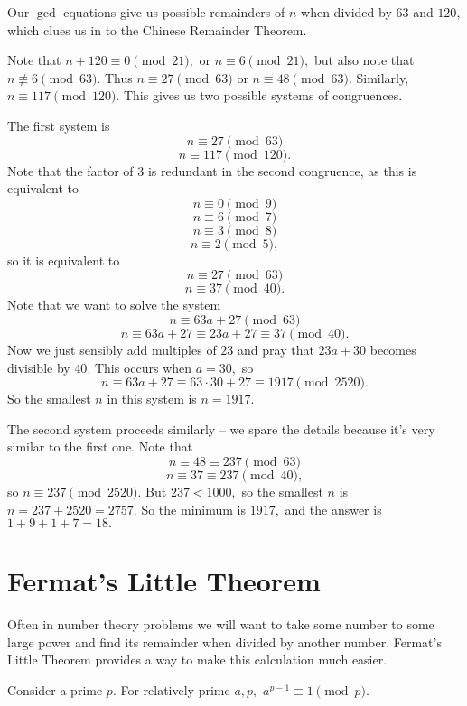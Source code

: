 \documentclass{article}
\begin{document}
\begin{sol}
Our $\gcd$ equations give us possible remainders of $n$ when divided by $63$ and $120,$ which clues us in to the Chinese Remainder Theorem.

Note that $n+120\equiv 0\pmod{21},$ or $n\equiv 6\pmod{21},$ but also note that $n\not\equiv 6\pmod{63}.$ Thus $n\equiv 27\pmod{63}$ or $n\equiv 48\pmod{63}.$ Similarly, $n\equiv 117\pmod{120}.$ This gives us two possible systems of congruences.

The first system is
\[n\equiv 27\pmod{63}\]
\[n\equiv 117\pmod{120}.\]
Note that the factor of $3$ is redundant in the second congruence, as this is equivalent to
\[n\equiv 0\pmod{9}\]
\[n\equiv 6\pmod{7}\]
\[n\equiv 3\pmod{8}\]
\[n\equiv 2\pmod{5},\]
so it is equivalent to
\[n\equiv 27\pmod{63}\]
\[n\equiv 37\pmod{40}.\]
Note that we want to solve the system
\[n\equiv 63a+27\pmod{63}\]
\[n\equiv 63a+27\equiv 23a+27\equiv 37\pmod{40}.\]
Now we just sensibly add multiples of $23$ and pray that $23a+30$ becomes divisible by $40.$ This occurs when $a=30,$ so
\[n\equiv 63a+27\equiv 63\cdot 30+27\equiv 1917\pmod{2520}.\]
So the smallest $n$ in this system is $n=1917.$

The second system proceeds similarly -- we spare the details because it's very similar to the first one. Note that
\[n\equiv 48\equiv 237\pmod{63}\]
\[n\equiv 37\equiv 237\pmod{40},\]
so $n\equiv 237\pmod{2520}.$
But $237<1000,$ so the smallest $n$ is $n=237+2520=2757.$ So the minimum is $1917,$ and the answer is $1+9+1+7=18.$
\end{sol}

\section{Fermat's Little Theorem}

Often in number theory problems we will want to take some number to some large power and find its remainder when divided by another number. Fermat's Little Theorem provides a way to make this calculation much easier.

\begin{theo}
Consider a prime $p.$ For relatively prime $a,p,$ $a^{p-1}\equiv 1\pmod {p}.$
\end{theo}
\end{document}
